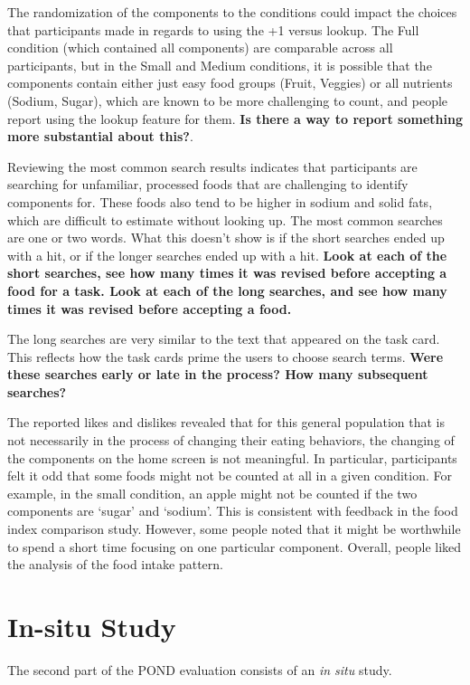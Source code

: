 The randomization of the components to the conditions could impact the choices that participants made in regards to using the +1 versus lookup. The Full condition (which contained all components) are comparable across all participants, but in the Small and Medium conditions, it is possible that the components contain either just easy food groups (Fruit, Veggies) or all nutrients (Sodium, Sugar), which are known to be more challenging to count, and people report using the lookup feature for them. \textbf{Is there a way to report something more substantial about this?}. 

Reviewing the most common search results indicates that participants are searching for unfamiliar, processed foods that are challenging to identify components for. These foods also tend to be higher in sodium and solid fats, which are difficult to estimate without looking up. The most common searches are one or two words. What this doesn't show is if the short searches ended up with a hit, or if the longer searches ended up with a hit. \textbf{Look at each of the short searches, see how many times it was revised before accepting a food for a task. Look at each of the long searches, and see how many times it was revised before accepting a food. } 

The long searches are very similar to the text that appeared on the task card. This reflects how the task cards prime the users to choose search terms. \textbf{Were these searches early or late in the process? How many subsequent searches?}

The reported likes and dislikes revealed that for this general population that is not necessarily in the process of changing their eating behaviors, the changing of the components on the home screen is not meaningful. In particular, participants felt it odd that some foods might not be counted at all in a given condition. For example, in the small condition, an apple might not be counted if the two components are `sugar' and `sodium'. This is consistent with feedback in the food index comparison study. However, some people noted that it might be worthwhile to spend a short time focusing on one particular component. Overall, people liked the analysis of the food intake pattern. 

\section{In-situ Study}

The second part of the POND evaluation consists of an \textit{in situ} study. 


